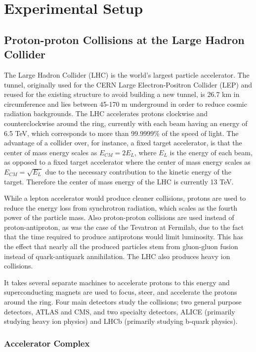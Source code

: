 \chapter{Experimental Setup}


\section{Proton-proton Collisions at the Large Hadron Collider}
The Large Hadron Collider (LHC) is the world's largest particle accelerator.  The tunnel, originally used for the CERN Large Electron-Positron Collider (LEP) and reused for the existing structure to avoid building a new tunnel, is 26.7 km in circumference and lies between 45-170 m underground in order to reduce cosmic radiation backgrounds.  The LHC accelerates protons clockwise and counterclockwise around the ring, currently with each beam having an energy of 6.5 TeV, which corresponds to more than 99.9999\% of the speed of light.  The advantage of a collider over, for instance, a fixed target accelerator, is that the center of mass energy scales as $E_{CM} = 2E_{L}$, where $E_{L}$ is the energy of each beam, as opposed to a fixed target accelerator where the center of mass energy scales as $E_{CM}=\sqrt{E_{L}}$ due to the necessary contribution to the kinetic energy of the target.  Therefore the center of mass energy of the LHC is currently 13 TeV.

While a lepton accelerator would produce cleaner collisions, protons are used to reduce the energy loss from synchrotron radiation, which scales as the fourth power of the particle mass.  Also proton-proton collisions are used instead of proton-antiproton, as was the case of the Tevatron at Fermilab, due to the fact that the time required to produce antiprotons would limit luminosity.  This has the effect that nearly all the produced particles stem from gluon-gluon fusion instead of quark-antiquark annihilation.  The LHC also produces heavy ion collisions.

It takes several separate machines to accelerate protons to this energy and superconducting magnets are used to focus, steer, and accelerate the protons around the ring.  Four main detectors study the collisions; two general purpose detectors, ATLAS and CMS, and two specialty detectors, ALICE (primarily studying heavy ion physics) and LHCb (primarily studying b-quark physics). %



\subsection{Accelerator Complex}

